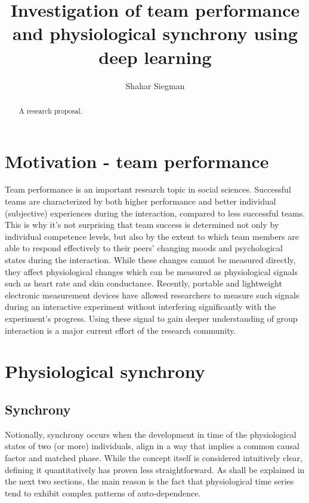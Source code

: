 \documentclass[a4paper, 11pt]{article}      %
\title{\LARGE \bf
Investigation of team performance 
and physiological synchrony
using deep learning }
\author{Shahar Siegman}
\begin{document}
\maketitle
\thispagestyle{empty}
\pagestyle{empty}


\begin{abstract}

A research proposal.

\end{abstract}

\section{Motivation - team performance}
Team performance is an important research topic in social sciences. Successful teams are characterized by both higher performance and better individual (subjective) experiences during the interaction, compared to less successful teams. This is why it's not surprising that team success is determined not only by individual competence levels, but also by the extent to which team members are able to respond effectively to their peers' changing moods and psychological states during the interaction. While these changes cannot be measured directly, they affect physiological changes which can be measured as physiological signals such as heart rate and skin conductance. Recently, portable and lightweight electronic measurement devices have allowed researchers to measure such signals during an interactive experiment without interfering significantly with the experiment's progress. Using these signal to gain deeper understanding of group interaction is a major current effort of the research community. 


\section{Physiological synchrony}
\subsection{Synchrony}
Notionally, synchrony occurs when the development in time of the physiological states of two (or more) individuals, align in a way that implies a common causal factor and matched phase. 
While the concept itself is considered intuitively clear, defining it quantitatively has proven less straightforward. As shall be explained in the next two sections, the main reason is the fact that physiological time series tend to exhibit complex patterns of auto-dependence. 
\end{document}
